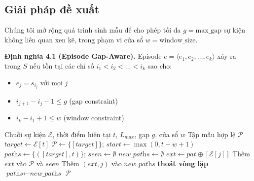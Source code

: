 \documentclass[14pt,a4paper,oneside]{extreport}
\begin{document}
\subsection{Giải pháp đề xuất}
Chúng tôi mở rộng quá trình sinh mẫu để cho phép tối đa $g = \text{max\_gap}$ sự kiện không liên quan xen kẽ, trong phạm vi cửa sổ $w = \text{window\_size}$.

\textbf{Định nghĩa 4.1 (Episode Gap-Aware).} Episode $e = \langle e_1, e_2, \dots, e_k \rangle$ xảy ra trong $S$ nếu tồn tại các chỉ số $i_1 < i_2 < \dots < i_k$ sao cho:
\begin{itemize}
    \item $e_j = s_{i_j}$ với mọi $j$
    \item $i_{j+1} - i_j - 1 \leq g$ (gap constraint)
    \item $i_k - i_1 + 1 \leq w$ (window constraint)
\end{itemize}

\begin{algorithm}[!ht]
\small
\caption{Sinh mẫu Gap-Aware Episode}
\label{alg:gap}
\begin{algorithmic}[1]
\REQUIRE Chuỗi sự kiện $\mathcal{E}$, thời điểm hiện tại $t$, $L_{max}$, gap $g$, cửa sổ $w$
\ENSURE Tập mẫu hợp lệ $\mathcal{P}$
\STATE $\textit{target} \leftarrow \mathcal{E}[t]$
\STATE $\mathcal{P} \leftarrow \{[\textit{target}]\}$; $\textit{start} \leftarrow \max(0, t - w + 1)$
\STATE $\textit{paths} \leftarrow \{([\textit{target}], t)\}$; $\textit{seen} \leftarrow \emptyset$
    \STATE $\textit{new\_paths} \leftarrow \emptyset$
            \STATE $\textit{ext} \leftarrow \textit{pat} \oplus [\mathcal{E}[j]]$ 
                \STATE Thêm $\textit{ext}$ vào $\mathcal{P}$ và $\textit{seen}$
                \STATE Thêm $(\textit{ext}, j)$ vào $\textit{new\_paths}$
            \ENDIF
                \STATE \textbf{thoát vòng lặp} 
            \ENDIF
        \ENDFOR
    \ENDFOR
    \STATE $\textit{paths} \leftarrow \textit{new\_paths}$
\ENDFOR
\RETURN $\mathcal{P}$
\end{algorithmic}
\end{algorithm}
\vspace{-0.5em}
\end{document}
